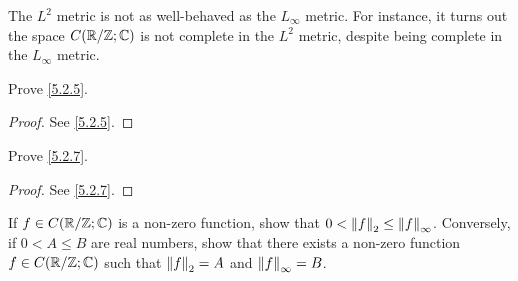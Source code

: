\begin{rmk}\label{5.2.10}
  The \(L^2\) metric is not as well-behaved as the \(L_\infty\) metric.
  For instance, it turns out the space \(C(\R / \Z ; \C)\) is not complete in the \(L^2\) metric, despite being complete in the \(L_\infty\) metric.
\end{rmk}

\exercisesection

\begin{ex}\label{ex:5.2.1}
  Prove \cref{5.2.5}.
\end{ex}

\begin{proof}
  See \cref{5.2.5}.
\end{proof}

\begin{ex}\label{ex:5.2.2}
  Prove \cref{5.2.7}.
\end{ex}

\begin{proof}
  See \cref{5.2.7}.
\end{proof}

\begin{ex}\label{ex:5.2.3}
  If \(f \in C(\R / \Z ; \C)\) is a non-zero function, show that \(0 < \norm*{f}_2 \leq \norm*{f}_\infty\).
  Conversely, if \(0 < A \leq B\) are real numbers, show that there exists a non-zero function \(f \in C(\R / \Z ; \C)\) such that \(\norm*{f}_2 = A\) and \(\norm*{f}_\infty = B\).
\end{ex}

